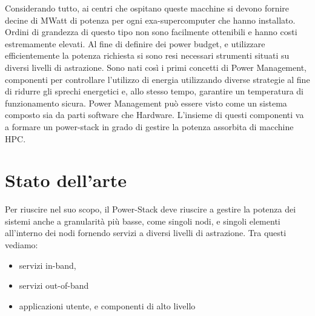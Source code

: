 Considerando tutto, ai centri che ospitano queste macchine si devono fornire decine di MWatt di potenza per ogni exa-supercomputer che hanno installato. 
Ordini di grandezza di questo tipo non sono facilmente ottenibili e hanno costi estremamente elevati. 
Al fine di definire dei power budget, e utilizzare efficientemente la potenza richiesta si sono resi necessari strumenti situati su diversi livelli di astrazione. 
Sono nati così i primi concetti di Power Management, componenti per controllare l'utilizzo di energia utilizzando diverse strategie al fine di ridurre gli sprechi energetici e, allo stesso tempo, garantire un temperatura di funzionamento sicura.
Power Management può essere visto come un sistema composto sia da parti software che Hardware. L'insieme di questi componenti va a formare un power-stack in grado di gestire la potenza assorbita di macchine HPC.

\section{Stato dell'arte}
Per riuscire nel suo scopo, il Power-Stack deve riuscire a gestire la potenza dei sistemi anche a granularità più basse, come singoli nodi, e singoli elementi all'interno dei nodi fornendo servizi a diversi livelli di astrazione.
Tra questi vediamo:
\begin{itemize}    
    \item servizi in-band, 
    \item servizi out-of-band
    \item applicazioni utente, e componenti di alto livello%
\end{itemize}

